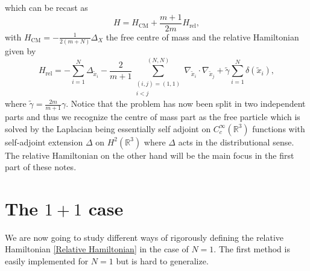 \documentclass[a4paper,11pt]{article}
\numberwithin{equation}{section}
\begin{document}
which can be recast as \begin{equation}
H=H_{\text{CM}}+\frac{m+1}{2m}H_{\text{rel}},
\end{equation}
with $ H_{\text{CM}}=-\frac{1}{2(m+N)}\Delta_X $ the free centre of mass and the relative Hamiltonian given by \begin{equation}\label{Relative Hamiltonian}
H_{\text{rel}}=-\sum_{i=1}^{N}\Delta_{\tilde{x}_i}-\frac{2}{m+1}\sum_{\substack{(i,j)=(1,1)\\i<j}}^{(N,N)}\nabla_{\tilde{x}_i}\cdot\nabla_{\tilde{x}_j}+\tilde{\gamma}\sum_{i=1}^{N}\delta(\tilde{x}_i),
\end{equation}
where $ \tilde{\gamma}=\frac{2m}{m+1}\gamma $. Notice that the problem has now been split in two independent parts and thus we recognize the centre of mass part as the free particle which is solved by the Laplacian being essentially self adjoint on $ C^\infty_c(\mathbb{R}^3) $ functions with self-adjoint extension $ \Delta $ on $ H^2(\mathbb{R}^3) $ where $ \Delta $ acts in the distributional sense. The relative Hamiltonian on the other hand will be the main focus in the first part of these notes.
\section{The $ 1+1 $ case}
We are now going to study different ways of rigorously defining the relative Hamiltonian \eqref{Relative Hamiltonian} in the case of $ N=1 $. The first method is easily implemented for $ N=1 $ but is hard to generalize.
\end{document}
